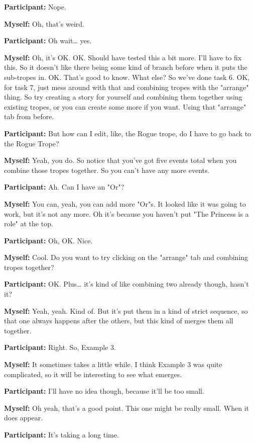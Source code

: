 \documentclass[11pt]{report}
\newcommand{\llabel}[1]{\hypertarget{llineno:#1}{\linelabel{#1}}}
\begin{document}
\begin{linenumbers}
\textbf{Participant:} Nope.

\textbf{Myself:} Oh, that's weird.

\textbf{Participant:} Oh wait\ldots{} yes.

\textbf{Myself:} Oh, it's OK. OK. Should have tested this a bit more. I'll have
to fix this. So it doesn't like there being some kind of branch before when it
puts the sub-tropes in. OK. That's good to know. What else? So we've done task
6. OK, for task 7, just mess around with that and combining tropes with the
"arrange" thing. So try creating a story for yourself and combining them
together using existing tropes, or you can create some more if you want. Using
that "arrange" tab from before.\llabel{lne:bug3c}

\textbf{Participant:} But how can I edit, like, the Rogue trope, do I have to go back to the Rogue Trope?

\textbf{Myself:} Yeah, you do. So notice that you've got five events total when
you combine those tropes together. So you can't have any more events.\llabel{lne:bug1c}

\textbf{Participant:} Ah. Can I have an "Or"?

\textbf{Myself:} You can, yeah, you can add more "Or"s. It looked like it was going to work, but it's not any more. Oh it's because you haven't put "The Princess is a role" at the top.

\textbf{Participant:} Oh, OK. Nice.

\textbf{Myself:} Cool. Do you want to try clicking on the "arrange" tab and combining tropes together?

\textbf{Participant:} OK. Plus\ldots{} it's kind of like combining two already though, hasn't it?

\textbf{Myself:} Yeah, yeah. Kind of. But it's put them in a kind of strict sequence, so that one always happens after the others, but this kind of merges them all together.

\textbf{Participant:} Right. So, Example 3.

\textbf{Myself:} It sometimes takes a little while. I think Example 3 was quite complicated, so it will be interesting to see what emerges.

\textbf{Participant:} I'll have no idea though, because it'll be too small.

\textbf{Myself:} Oh yeah, that's a good point. This one might be really small. When it does appear.

\textbf{Participant:} It's taking a long time.


\end{linenumbers}
\end{document}
